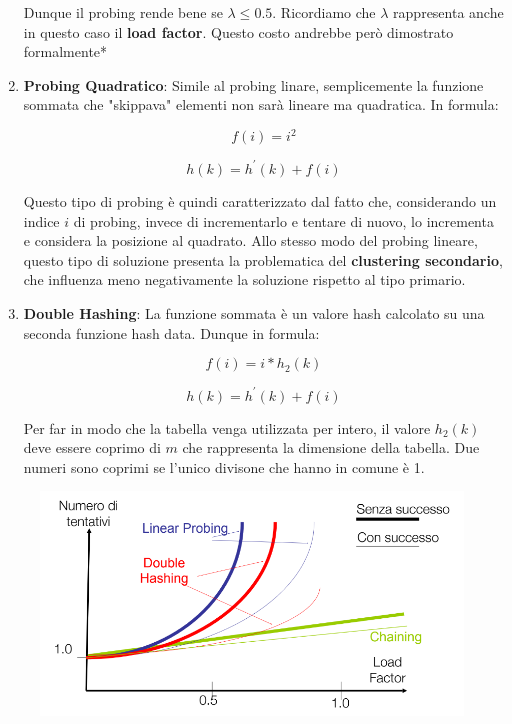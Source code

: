 \documentclass{article}
\begin{document}
\begin{enumerate}
Dunque il probing rende bene se $\lambda \leq 0.5$. Ricordiamo che $\lambda$ rappresenta anche in questo caso il \textbf{load factor}.
Questo costo andrebbe però dimostrato formalmente*

\newpage

    \item \textbf{Probing Quadratico}: Simile al probing linare, semplicemente la funzione sommata che "skippava" elementi non sarà lineare ma quadratica. In formula:

    \begin{equation}
        f(i)=i^{2}
    \end{equation}
    
    \begin{equation}
        h(k)=h^{'}(k)+f(i)
    \end{equation}

Questo tipo di probing è quindi caratterizzato dal fatto che, considerando un indice $i$ di probing, invece di incrementarlo e tentare di nuovo, lo incrementa e considera la posizione al quadrato. Allo stesso modo del probing lineare, questo tipo di soluzione presenta la problematica del \textbf{clustering secondario}, che influenza meno negativamente la soluzione rispetto al tipo primario.

\item \textbf{Double Hashing}: La funzione sommata è un valore hash calcolato su una seconda funzione hash data. Dunque in formula:

\begin{equation}
    f(i)=i*h_{2}(k)
\end{equation}

\begin{equation}
    h(k)=h^{'}(k)+f(i)
\end{equation}

Per far in modo che la tabella venga utilizzata per intero, il valore $h_{2}(k)$ deve essere coprimo di $m$ che rappresenta la dimensione della tabella.
Due numeri sono coprimi se l'unico divisone che hanno in comune è 1.
    
\end{enumerate}

\begin{figure}[htbp]
        \center
        \includegraphics[scale=0.35]{img/openAddressingImg1.png}
    \end{figure}
\end{document}
